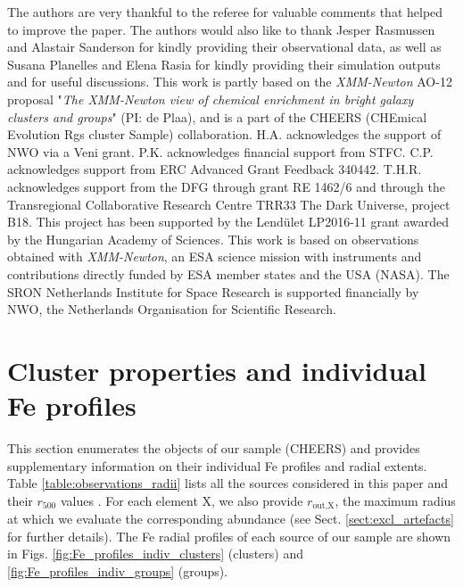 \documentclass{aa}
\begin{document}
\begin{acknowledgements}
The authors are very thankful to the referee for valuable comments that helped to improve the paper. The authors would also like to thank Jesper Rasmussen and Alastair Sanderson for kindly providing their observational data, as well as Susana Planelles and Elena Rasia for kindly providing their simulation outputs and for useful discussions. This work is partly based on the \textit{XMM-Newton} AO-12 proposal "\emph{The XMM-Newton view of chemical enrichment in bright galaxy clusters and groups}" (PI: de Plaa), and is a part of the CHEERS (CHEmical Evolution Rgs cluster Sample) collaboration. H.A. acknowledges the support of NWO via a Veni grant. P.K. acknowledges financial support from STFC. C.P. acknowledges support from ERC Advanced Grant Feedback 340442. T.H.R. acknowledges support from the DFG through grant RE 1462/6 and through the Transregional Collaborative Research Centre TRR33 The Dark Universe, project B18. This project has been supported by the Lend\"ulet LP2016-11 grant awarded by the Hungarian Academy of Sciences. This work is based on observations obtained with \textit{XMM-Newton}, an ESA science mission with instruments and contributions directly funded by ESA member states and the USA (NASA). The SRON Netherlands Institute for Space Research is supported financially by NWO, the Netherlands Organisation for Scientific Research.
\end{acknowledgements}












{}



\newpage
\appendix













\section{Cluster properties and individual Fe profiles}

This section enumerates the objects of our sample (CHEERS) and provides supplementary information on their individual Fe profiles and radial extents. Table \ref{table:observations_radii} lists all the sources considered in this paper and their $r_{500}$ values \citep[adapted from][and references therein]{2015A&A...575A..38P}. For each element X, we also provide $r_\text{out,X}$, the maximum radius at which we evaluate the corresponding abundance (see Sect. \ref{sect:excl_artefacts} for further details). The Fe radial profiles of each source of our sample are shown in Figs. \ref{fig:Fe_profiles_indiv_clusters} (clusters) and \ref{fig:Fe_profiles_indiv_groups} (groups).
\end{document}
